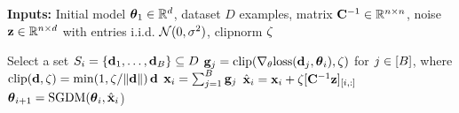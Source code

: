 \documentclass{article}
\begin{document}
\begin{algorithm}[t]
\caption{\MFFTRL and \DPSGD}\label{alg:dpftrl}
\begin{algorithmic}%
\State \textbf{Inputs:}  Initial model $\boldsymbol{\theta}_1 \in \mathbb{R}^d$, dataset $D$ examples, matrix $\mathbf{C}^{-1} \in \mathbb{R}^{{n \times n}}$, 
noise $\mathbf{z} \in \mathbb{R}^{n \times d}$ with entries i.i.d. $\mathcal{N}(0, \sigma^2)$, clipnorm $\zeta$ 
  
  \State Select a set $S_i = \{\mathbf{d}_1, \dots, \mathbf{d}_B \} \subseteq D$
  \State $\mathbf{g}_j = \text{clip}(\nabla_\theta \text{loss}(\mathbf{d}_j, \boldsymbol{\theta}_i), \zeta)$ for $j \in [B]$, where $\text{clip}(\mathbf{d}, \zeta) = \min(1, \zeta/\| \mathbf{d} \|)\,\mathbf{d}$ 
  \State $\mathbf{x}_i = \sum_{j=1}^B \mathbf{g}_j$
  \State $\hat{\mathbf{x}}_i = \mathbf{x}_i + \zeta [\mathbf{C}^{-1} \mathbf{z}]_{[i, :]}$
  \State $\boldsymbol{\theta}_{i+1} = \text{SGDM}(\boldsymbol{\theta}_i, \hat{\mathbf{x}}_i$) 
\EndFor
\end{algorithmic}
\end{algorithm}
\end{document}
